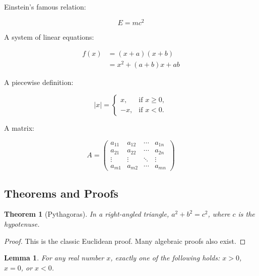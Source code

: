 \documentclass[11pt]{article}
\theoremstyle{definition}
\theoremstyle{plain}
\newtheorem{theorem}[definition]{Theorem}
\newtheorem{lemma}[definition]{Lemma}
\begin{document}
Einstein's famous relation:

\begin{equation}
    \label{eq:einstein}
    E = mc^2
\end{equation}

A system of linear equations:

\begin{align}
    \label{eq:linear}
    f(x) &= (x+a)(x+b) \nonumber \\
         &= x^2 + (a+b)x + ab
\end{align}

A piecewise definition:

\begin{equation}
    \label{eq:piecewise}
    |x| =
    \begin{cases}
        x,  & \text{if } x \ge 0, \\
        -x, & \text{if } x < 0.
    \end{cases}
\end{equation}

A matrix:

\begin{equation}
    \label{eq:matrix}
    A =
    \begin{pmatrix}
        a_{11} & a_{12} & \cdots & a_{1n} \\
        a_{21} & a_{22} & \cdots & a_{2n} \\
        \vdots & \vdots & \ddots & \vdots \\
        a_{m1} & a_{m2} & \cdots & a_{mn}
    \end{pmatrix}
\end{equation}

\subsection{Theorems and Proofs}
\label{sec:math:theorems}

\begin{theorem}[Pythagoras]
    \label{thm:pythagoras}
    In a right-angled triangle, $a^2 + b^2 = c^2$, where $c$ is the
    hypotenuse.
\end{theorem}

\begin{proof}
    This is the classic Euclidean proof.
    Many algebraic proofs also exist.
\end{proof}

\begin{lemma}
    \label{lem:trichotomy}
    For any real number $x$, exactly one of the following holds:
    $x > 0$, $x = 0$, or $x < 0$.
\end{lemma}
\end{document}

